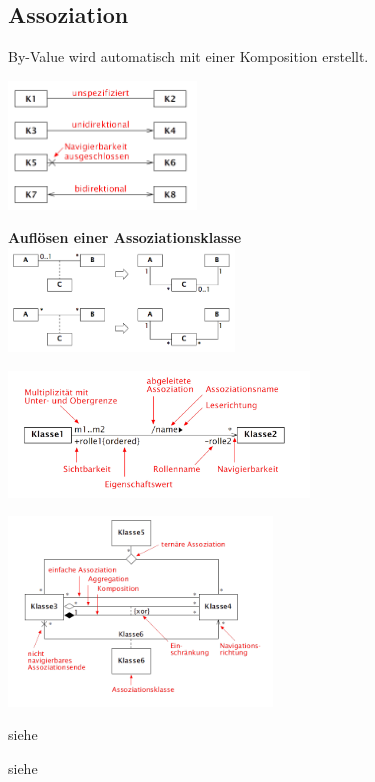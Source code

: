 \subsection{Assoziation }
  By-Value wird automatisch mit einer Komposition erstellt.
  \begin{description}[leftmargin=3.5cm]
    \item[Navigierbarkeit]
      \parbox{5cm}{\includegraphics[width=5cm]{./images/Navigierbarkeit.png}}
      \hspace{3cm}
      \parbox{8cm}{
      \textbf{Auflösen einer Assoziationsklasse}\\
      \includegraphics[width = 6cm]{./images/Aufloesen_Assoziationsklasse}}
      
    \item[Notation]
      \parbox{8cm}{\includegraphics[width=8cm]{./images/Notation_Assozi_1.png}}
      \parbox{7cm}{\includegraphics[width=7cm]{./images/Notation_Assozi_2.png}}
    \item[Eigenschaftswerte]
      siehe 
    \item[Implementation]
      siehe 
  \end{description}

